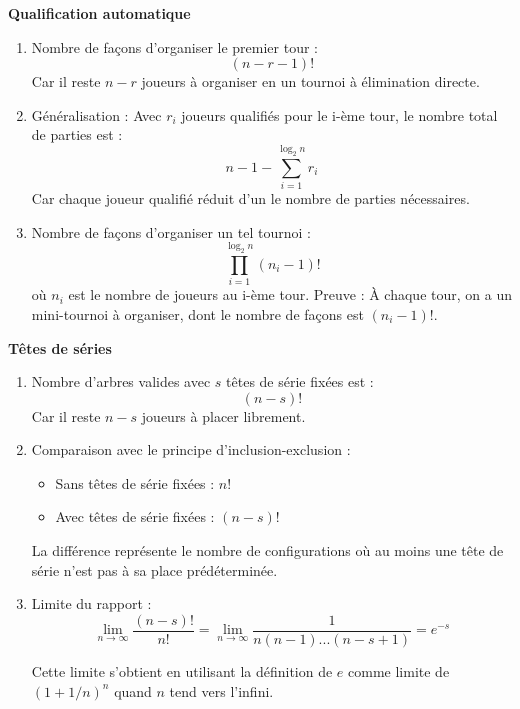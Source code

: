 \documentclass[10pt,a4paper]{article}
\begin{document}
\q \textbf{Qualification automatique}
\begin{enumerate}

        \item Nombre de façons d'organiser le premier tour : $$(n-r-1)!$$
        Car il reste $n-r$ joueurs à organiser en un tournoi à élimination directe.

        \item Généralisation : Avec $r_i$ joueurs qualifiés pour le i-ème tour, le nombre total de parties est :
        $$n - 1 - \sum_{i=1}^{\log_2 n} r_i$$
        Car chaque joueur qualifié réduit d'un le nombre de parties nécessaires.


        \item Nombre de façons d'organiser un tel tournoi :
        $$\prod_{i=1}^{\log_2 n} (n_i-1)!$$
          où $n_i$ est le nombre de joueurs au i-ème tour.
          Preuve : À chaque tour, on a un mini-tournoi à organiser, dont le nombre de façons est
          $(n_i-1)!$.

\end{enumerate}

\q \textbf{Têtes de séries}
\begin{enumerate}

        \item Nombre d'arbres valides avec $s$ têtes de série fixées est :
        $$(n-s)!$$
        Car il reste $n-s$ joueurs à placer librement.

        \item Comparaison avec le principe d'inclusion-exclusion :
          \begin{itemize}
               \item Sans têtes de série fixées : $n!$
               \item Avec têtes de série fixées : $(n-s)!$
          \end{itemize}
        La différence représente le nombre de configurations où au moins une tête de série n'est pas
        à sa place prédéterminée.


        \item Limite du rapport :
        $$\lim_{n \to \infty} \frac{(n-s)!}{n!} =
        \lim_{n \to \infty} \frac{1}{n(n-1)...(n-s+1)} =
        e^{-s}$$

        Cette limite s'obtient en utilisant la définition de $e$ comme limite de $(1+1/n)^n$ quand
        $n$ tend vers l'infini.

\end{enumerate}
\end{document}
